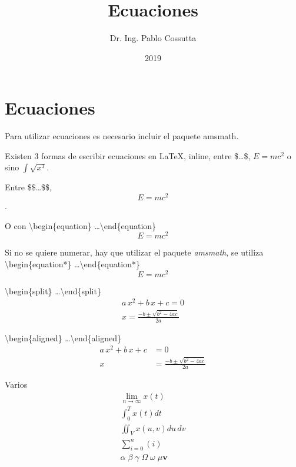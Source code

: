 \documentclass[11pt, a4paper]{article}
\title{Ecuaciones}
\author{Dr. Ing. Pablo Cossutta}
\date{2019}
\begin{document}
\maketitle
\section{Ecuaciones}
Para utilizar ecuaciones es necesario incluir el paquete amsmath.

Existen 3 formas de escribir ecuaciones en \LaTeX, inline, entre \$\dots \$, $E=mc^2$ o sino $\int \sqrt{x^3}$.

Entre \$\$\dots \$\$, $$E=mc^2$$.

O con \textbackslash begin\{equation\} \dots \textbackslash end\{equation\} 
\begin{equation}
	E=mc^2
\end{equation}

Si no se quiere numerar, hay que utilizar el paquete \textit{amsmath}, se utiliza \textbackslash begin\{equation*\} \dots \textbackslash end\{equation*\} 
\begin{equation*}
	E=mc^2
\end{equation*}

\textbackslash begin\{split\} \dots \textbackslash end\{split\}
\begin{equation}
	\begin{split}
		a\,x^2+b\,x+c = 0\\
		x = \frac{-b \pm \sqrt{b^2-4ac}}{2a}
	\end{split}
\end{equation}

\textbackslash begin\{aligned\} \dots \textbackslash end\{aligned\}
\begin{equation}
\begin{aligned}
	a\,x^2+b\,x+c &= 0\\
	x &= \frac{-b \pm \sqrt{b^2-4ac}}{2a}
\end{aligned}
\end{equation}

Varios
\begin{equation*}
\begin{split}
	\lim_{n \to\infty} x\left(t\right) \\
	\int_0^T x\left(t\right) dt \\
	\iint_V x\left(u,v\right) du\,dv \\
	\sum_{i=0}^n\left(i\right) \\
	\alpha \; \beta \; \gamma \; \Omega \; \omega \; \mu \bm{v}
\end{split}
\end{equation*}
\end{document}
